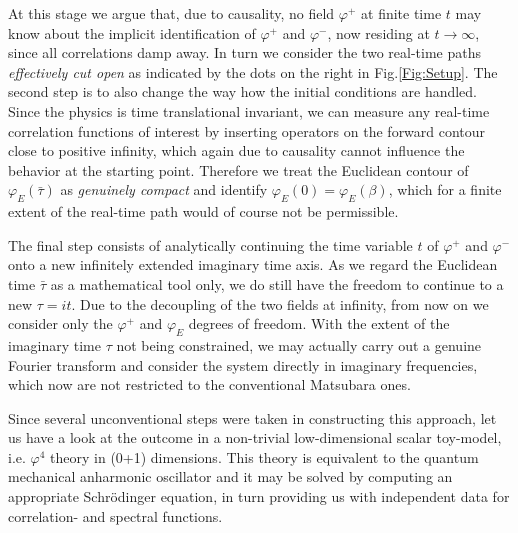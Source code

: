 \documentclass[epj]{webofc}
\begin{document}
At this stage we argue that, due to causality, no field $\varphi^+$ at finite time $t$ may know about the implicit identification of $\varphi^+$ and $\varphi^-$, now residing at $t\to\infty$, since all correlations damp away. In turn we consider the two real-time paths {\it effectively cut open} as indicated by the dots on the right in Fig.\ref{Fig:Setup}. The second step is to also change the way how the initial conditions are handled. Since the physics is time translational invariant, we can measure any real-time correlation functions of interest by inserting operators on the forward contour close to positive infinity, which again due to causality cannot influence the behavior at the starting point. Therefore we treat the Euclidean contour of $\varphi_E(\bar{\tau})$ as {\it genuinely compact} and identify $\varphi_E(0)=\varphi_E(\beta)$, which for a finite extent of the real-time path would of course not be permissible.

The final step consists of analytically continuing the time variable $t$ of $\varphi^+$ and $\varphi^-$ onto a new infinitely extended imaginary time axis. As we regard the Euclidean time $\bar{\tau}$ as a mathematical tool only, we do still have the freedom to continue to a new $\tau=it$. Due to the decoupling of the two fields at infinity, from now on we consider only the $\varphi^+$ and $\varphi_E$ degrees of freedom. With the extent of the imaginary time $\tau$ not being constrained, we may actually carry out a genuine Fourier transform and consider the system directly in imaginary frequencies, which now are not restricted to the conventional Matsubara ones. 

Since several unconventional steps were taken in constructing this approach, let us have a look at the outcome in a non-trivial low-dimensional scalar toy-model, i.e. $\varphi^4$ theory in (0+1) dimensions. This theory is equivalent to the quantum mechanical anharmonic oscillator and it may be solved by computing an appropriate Schr\"odinger equation, in turn providing us with independent data for correlation- and spectral functions. 
\end{document}
